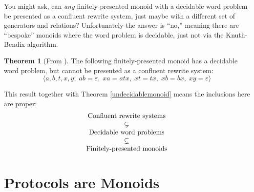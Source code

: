 \documentclass[a4paper,headsepline,bibliography=totoc,toc=flat,fleqn,twoside=semi]{scrbook}
\theoremstyle{definition}
\theoremstyle{definition}
\theoremstyle{definition}
\newtheorem{theorem}{Theorem}[chapter]
\begin{document}
You might ask, can \emph{any} finitely-presented monoid with a decidable word problem be presented as a confluent rewrite system, just maybe with a different set of generators and relations? Unfortunately the answer is ``no,'' meaning there are ``bespoke'' monoids where the word problem is decidable, just not via the Knuth-Bendix algorithm.
\begin{theorem}[From \cite{SQUIER1994271}] The following finitely-presented monoid has a decidable word problem, but cannot be presented as a confluent rewrite system:
\[\langle a, b, t, x, y;\; ab=\varepsilon,\; xa=atx,\; xt=tx,\; xb=bx,\; xy=\varepsilon\rangle\]
\end{theorem}
This result together with Theorem \ref{undecidablemonoid} means the inclusions here are proper:
\[
\begin{array}{c}
\hbox{Confluent rewrite systems} \\
\subsetneq \\
\hbox{Decidable word problems} \\
\subsetneq \\
\hbox{Finitely-presented monoids}
\end{array}
\]

\chapter{Protocols are Monoids}\label{protocolsasmonoids}
\end{document}
